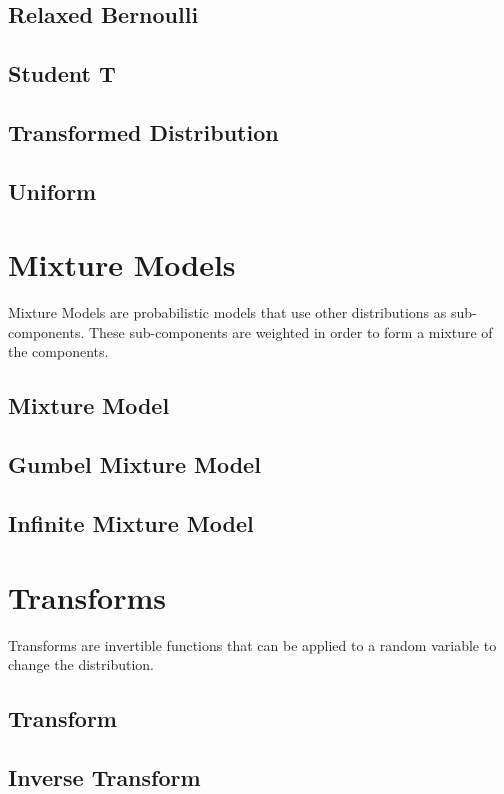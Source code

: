 \documentclass{article}
\begin{document}
\subsection{Relaxed Bernoulli}
\subsection{Student T}
\subsection{Transformed Distribution}
\subsection{Uniform}

\section{Mixture Models}
Mixture Models are probabilistic models that use other distributions as sub-components.
These sub-components are weighted in order to form a mixture of the components.
\subsection{Mixture Model}
\subsection{Gumbel Mixture Model}
\subsection{Infinite Mixture Model}

\section{Transforms}
Transforms are invertible functions that can be applied to a
random variable to change the distribution.
\subsection{Transform}
\subsection{Inverse Transform}
\end{document}
